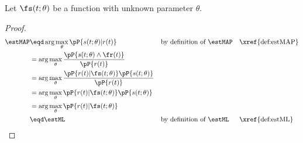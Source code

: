\begin{theorem}
\label{thm:map=ml}
Let $\fs(t;\theta)$ be a function with unknown parameter $\theta$.
\end{theorem}
\begin{proof}
\begin{align*}
   \estMAP
     &\eqd \arg\max_{\theta} \pP{s(t;\theta)|r(t)}
     &&    \text{by definition of $\estMAP$}
     &&    \text{\xref{def:estMAP}}
   \\&=    \arg\max_{\theta} \frac{\pP{s(t;\theta) \land \fr(t)}}
                               {\pP{r(t)}}
   \\&=    \arg\max_{\theta} \frac{\pP{r(t) | \fs(t;\theta) }\pP{s(t;\theta) }}
                               {\pP{r(t)}}
   \\&=    \arg\max_{\theta} \pP{r(t) | \fs(t;\theta) }\pP{s(t;\theta) }
   \\&=    \arg\max_{\theta} \pP{r(t) | \fs(t;\theta) }
   \\&\eqd \estML
     &&  \text{by definition of $\estML$}
     &&  \text{\xref{def:estML}}
\end{align*}
\end{proof}




